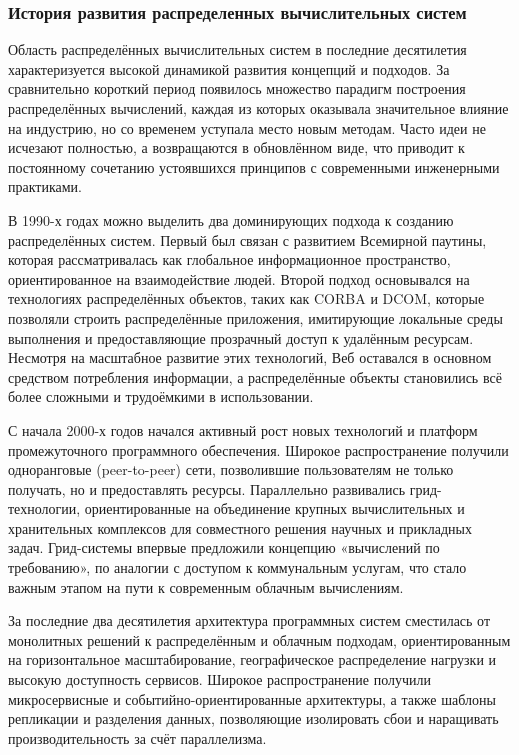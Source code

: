 \subsubsection{История развития распределенных вычислительных систем}

Область распределённых вычислительных систем в последние десятилетия
характеризуется высокой динамикой развития концепций и подходов. За
сравнительно короткий период появилось множество парадигм построения
распределённых вычислений, каждая из которых оказывала значительное влияние на
индустрию, но со временем уступала место новым методам. Часто идеи не исчезают
полностью, а возвращаются в обновлённом виде, что приводит к постоянному
сочетанию устоявшихся принципов с современными инженерными практиками.

В 1990-х годах можно выделить два доминирующих подхода к созданию
распределённых систем. Первый был связан с развитием Всемирной паутины, которая
рассматривалась как глобальное информационное пространство, ориентированное на
взаимодействие людей. Второй подход основывался на технологиях распределённых
объектов, таких как CORBA \cite{siegel1998corba} и DCOM\cite{microsoftDCOM},
которые позволяли строить распределённые приложения, имитирующие локальные
среды выполнения и предоставляющие прозрачный доступ к удалённым ресурсам.
Несмотря на масштабное развитие этих технологий, Веб оставался в основном
средством потребления информации, а распределённые объекты становились всё
более сложными и трудоёмкими в использовании.

С начала 2000-х годов начался активный рост новых технологий и платформ
промежуточного программного обеспечения. Широкое распространение получили
одноранговые (peer-to-peer) сети, позволившие пользователям не только получать,
но и предоставлять ресурсы. Параллельно развивались грид-технологии,
ориентированные на объединение крупных вычислительных и хранительных комплексов
для совместного решения научных и прикладных задач. Грид-системы впервые
предложили концепцию «вычислений по требованию», по аналогии с доступом к
коммунальным услугам, что стало важным этапом на пути к современным облачным
вычислениям.

За последние два десятилетия архитектура программных систем сместилась от
монолитных решений к распределённым и облачным подходам, ориентированным на
горизонтальное масштабирование, географическое распределение нагрузки и высокую
доступность сервисов. Широкое распространение получили микросервисные и
событийно-ориентированные архитектуры, а также шаблоны репликации и разделения
данных, позволяющие изолировать сбои и наращивать производительность за счёт
параллелизма.


